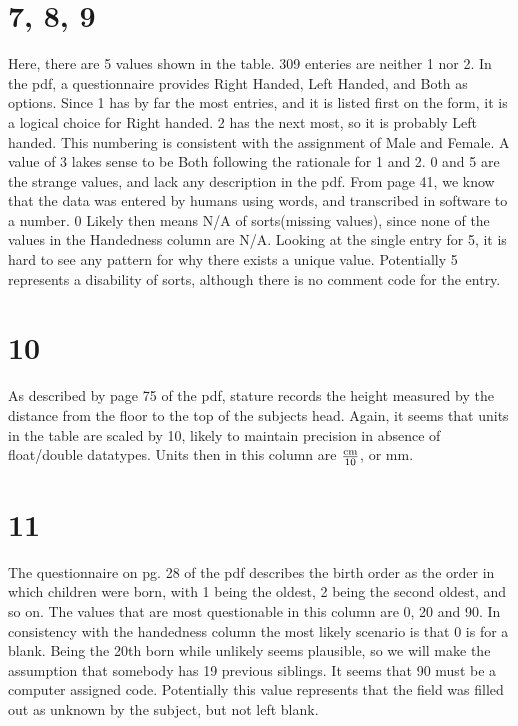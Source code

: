 \documentclass[a4paper]{article}
\begin{document}
\section*{7, 8, 9}%
Here, there are 5 values shown in the table. 309 enteries are neither 1 nor 2. In the pdf, a questionnaire provides Right Handed, Left Handed, and Both as options. Since 1 has by far the most entries, and it is listed first on the form, it is a logical choice for Right handed. 2 has the next most, so it is probably Left handed. This numbering is consistent with the assignment of Male and Female. A value of 3 lakes sense to be Both following the rationale for 1 and 2. 0 and 5 are the strange values, and lack any description in the pdf. From page 41, we know that the data was entered by humans using words, and transcribed in software to a number. 0 Likely then means N/A of sorts(missing values), since none of the values in the Handedness column are N/A. Looking at the single entry for 5, it is hard to see any pattern for why there exists a unique value. Potentially 5 represents a disability of sorts, although there is no comment code for the entry.

\section*{10}%
As described by page 75 of the pdf, stature records the height measured by the distance from the floor to the top of the subjects head.
Again, it seems that units in the table are scaled by 10, likely to maintain precision in absence of float/double datatypes. Units then in this column are \(\frac{\textnormal{cm}}{10}\), or mm.

\section*{11}%
\label{sec:11}

The questionnaire on pg. 28 of the pdf describes the birth order as the order in which children were born, with 1 being the oldest, 2 being the second oldest, and so on.
The values that are most questionable in this column are 0, 20 and 90. 
In consistency with the handedness column the most likely scenario is that 0 is for a blank. Being the 20th born while unlikely seems plausible, so we will make the assumption that somebody has 19 previous siblings. It seems that 90 must be a computer assigned code. Potentially this value represents that the field was filled out as unknown by the subject, but not left blank.
\end{document}
